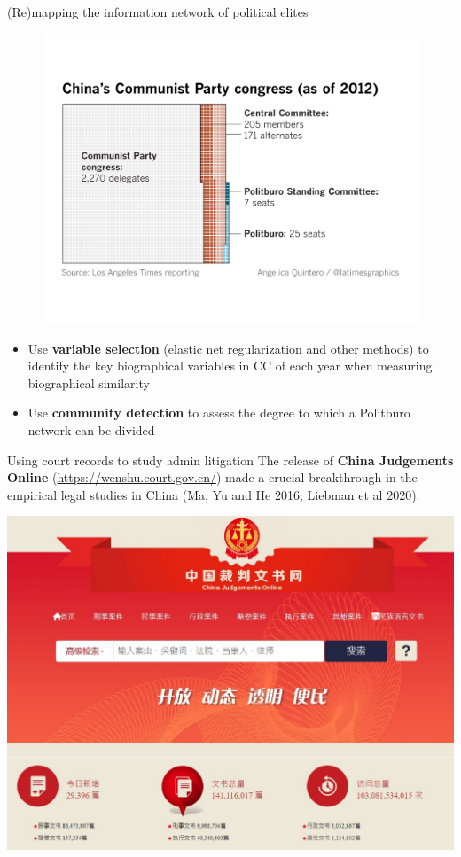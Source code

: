 \documentclass[
  10pt,
  ignorenonframetext,
]{beamer}
\begin{document}
\begin{frame}{(Re)mapping the information network of political elites}
\label{remapping-the-information-network-of-political-elites-2}
\begin{figure}
\centering
\includegraphics[scale=0.26]{Figs/selection}
\end{figure}
\vspace{0.3cm}
\begin{itemize}
  \item Use \textbf{variable selection} (elastic net regularization and other methods) to identify the key biographical variables in CC of each year when measuring biographical similarity
  \vspace{0.1cm}
  \item Use \textbf{community detection} to assess the degree to which a Politburo network can be divided
\end{itemize}
\end{frame}

\begin{frame}{Using court records to study admin litigation}
\label{using-court-records-to-study-admin-litigation}
The release of \textbf{China Judgements Online}
(\url{https://wenshu.court.gov.cn/}) made a crucial breakthrough in the
empirical legal studies in China (Ma, Yu and He 2016; Liebman et al
2020). \vspace{0.2cm}

\begin{center}\includegraphics[width=0.65\linewidth]{Figs/wenshu_crop} \end{center}
\end{frame}
\end{document}
